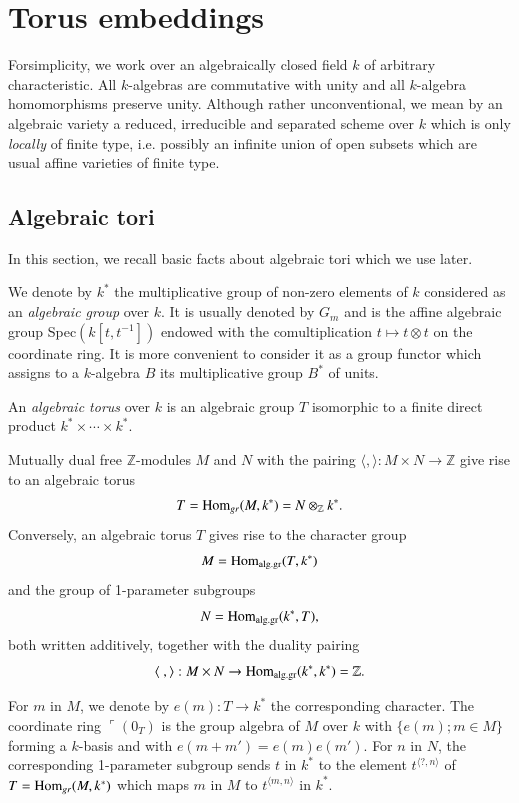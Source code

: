 \chapter{Torus embeddings}\label{chap1}

For\pageoriginale simplicity, we work over an algebraically closed
field $k$ of arbitrary characteristic. All $k$-algebras are
commutative with unity and all $k$-algebra homomorphisms preserve
unity. Although rather unconventional, we mean by an algebraic
variety a reduced, irreducible and separated scheme over $k$ which is
only \textit{locally} of finite type, i.e. possibly an infinite union
of open subsets which are usual affine varieties of finite type.  


\section{Algebraic tori}\label{chap1:sec1}%

In this section, we recall basic facts about algebraic tori which we
use later. 

We denote by $k^*$ the multiplicative group of non-zero elements of
$k$ considered as an \textit{algebraic group} over $k$. It is usually
denoted by $G_m$ and is the affine algebraic group Spec$(k[t,t^{-1}])$
endowed with the comultiplication $t\longmapsto t \otimes t $ on the
coordinate ring. It is more convenient to consider it as a group
functor which assigns to a $k$-algebra $B$ its multiplicative group
$B^*$ of  units. 

An \textit{algebraic torus} over $k$ is an algebraic group $T$
isomorphic to a finite direct product $k^* \times \cdots \times k^*$. 

Mutually dual free $\mathbb{Z}$-modules $M$ and $N$ with the pairing
$\langle , \rangle : M \times N \rightarrow \mathbb{Z}$ give rise to
an algebraic torus 
$$
T = \operatorname{Hom}_{gr}(M,k^*) = N \otimes_{\mathbb{Z}} k^*.
$$\pageoriginale
Conversely, an algebraic torus $T$ gives rise to the character group 
$$
M = \operatorname{Hom}_{\text{alg.gr}}(T,k^*)
$$
and the group of 1-parameter subgroups
$$
N = \operatorname{Hom}_{\text{alg.gr}}(k^*,T),
$$
both written additively, together with the duality pairing  
$$
\langle~ , \rangle : M \times N \rightarrow \operatorname{Hom}_{\text{alg.gr}} (k^*,k^*) =
\mathbb{Z}. 
$$

\noindent
For $m$ in $M$, we denote by $e(m) : T \rightarrow k^*$ the
corresponding character. The coordinate ring $\ulcorner (0_T)$ is the
group algebra of $M$ over $k$ with $\{ e(m) ; m \in M\}$ forming a
$k$-basis and with $e(m + m') = e(m) e(m')$. For $n$ in $N$, the
corresponding 1-parameter subgroup sends $t$ in $k^*$ to the element
$t^{\langle ? , n \rangle}$ of $T = \operatorname{Hom}_{gr}(M,k^*)$ which maps $m$
in $M$ to $t^{\langle m,n \rangle}$ in $k^*$. 

